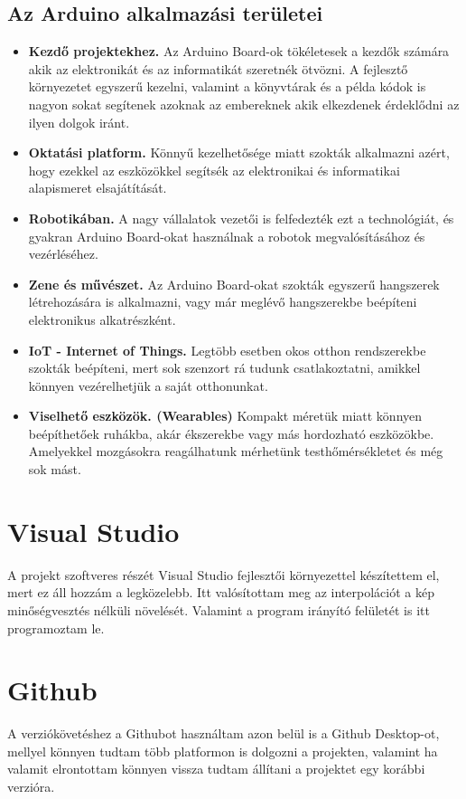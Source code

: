 \documentclass[]{thesis-ekf}
\theoremstyle{definition}
\theoremstyle{remark}
\begin{document}
\subsection{Az Arduino alkalmazási területei}
\begin{itemize}
	\item \textbf{Kezdő projektekhez.} Az Arduino Board-ok tökéletesek a kezdők számára akik az elektronikát és az informatikát szeretnék ötvözni. A fejlesztő környezetet egyszerű kezelni, valamint a könyvtárak és a példa kódok is nagyon sokat segítenek azoknak az embereknek akik elkezdenek érdeklődni az ilyen dolgok iránt.
	\item \textbf{Oktatási platform.} Könnyű kezelhetősége miatt szokták alkalmazni azért, hogy ezekkel az eszközökkel segítsék az elektronikai és informatikai alapismeret elsajátítását.
	\item \textbf{Robotikában.} A nagy vállalatok vezetői is felfedezték ezt a technológiát, és gyakran Arduino Board-okat használnak a robotok megvalósításához és vezérléséhez.
	\item \textbf{Zene és művészet.} Az Arduino Board-okat szokták egyszerű hangszerek létrehozására is alkalmazni, vagy már meglévő hangszerekbe beépíteni elektronikus alkatrészként.
	\item \textbf{IoT - Internet of Things.} Legtöbb esetben okos otthon rendszerekbe szokták beépíteni, mert sok szenzort rá tudunk csatlakoztatni, amikkel könnyen vezérelhetjük a saját otthonunkat. 
	\item \textbf{Viselhető eszközök. (Wearables)} Kompakt méretük miatt könnyen beépíthetőek ruhákba, akár ékszerekbe vagy más hordozható eszközökbe. Amelyekkel mozgásokra reagálhatunk mérhetünk testhőmérsékletet és még sok mást.
\end{itemize}
\section{Visual Studio}
A projekt szoftveres részét Visual Studio\cite{visual-studio} fejlesztői környezettel készítettem el, mert ez áll hozzám a legközelebb. Itt valósítottam meg az interpolációt a kép minőségvesztés nélküli növelését. Valamint a program irányító felületét is itt programoztam le. 
\section{Github}
A verziókövetéshez a Githubot\cite{github} használtam azon belül is a Github Desktop-ot, mellyel könnyen tudtam több platformon is dolgozni a projekten, valamint ha valamit elrontottam könnyen vissza tudtam állítani a projektet egy korábbi verzióra.
\end{document}
